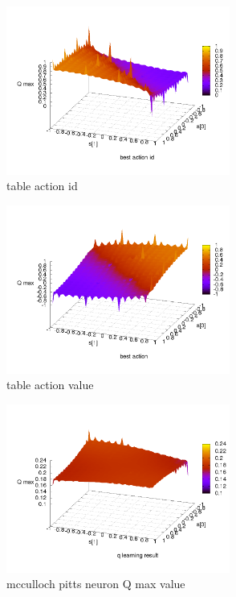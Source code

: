\documentclass[10pt,a5paper]{article}
\begin{document}
\begin{figure}[!ht]
\centering
\includegraphics[width=2.9in]{q_learning_test/experiment_02/table/q_action_id.png}
\caption{table action id}
\label{table action id}
\end{figure}

\begin{figure}[!ht]
\centering
\includegraphics[width=2.9in]{q_learning_test/experiment_02/table/q_action.png}
\caption{table action value}
\label{table action value}
\end{figure}

\begin{figure}[!ht]
\centering
\includegraphics[width=2.9in]{q_learning_test/experiment_02/mcculloch_pitts_neuron/q_map.png}
\caption{mcculloch pitts neuron Q max value}
\label{mcculloch pitts neuron Q max value}
\end{figure}
\end{document}
